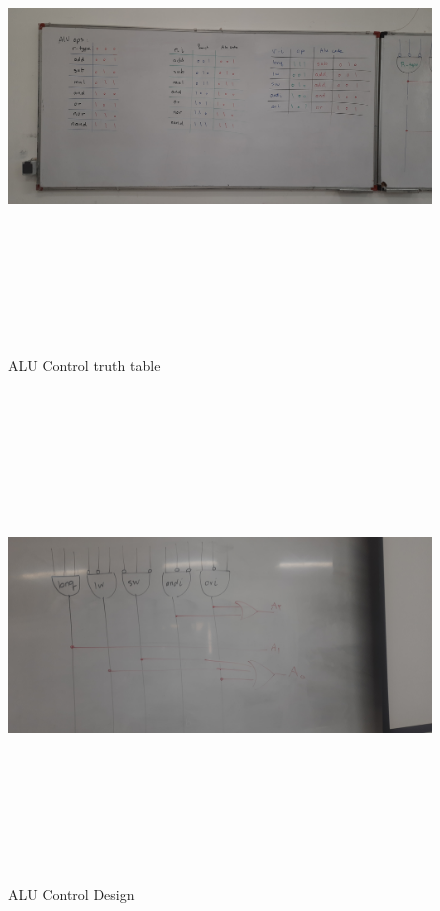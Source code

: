 \documentclass[12pt, dvipsnames, svgnames, x11names, oneside]{book}
\begin{document}
			\begin{figure}[H]
				\begin{center}
					\includegraphics[width=18cm, height=13cm, angle=90]{./images/aluctrl}
				\end{center}
				\caption{ALU Control truth table}							
			\end{figure}
		
			\begin{figure}[H]
				\begin{center}
					\includegraphics[width=18cm, height=13cm, angle=90]{./images/aluctl}
				\end{center}
				\caption{ALU Control Design}							
			\end{figure}
\end{document}
